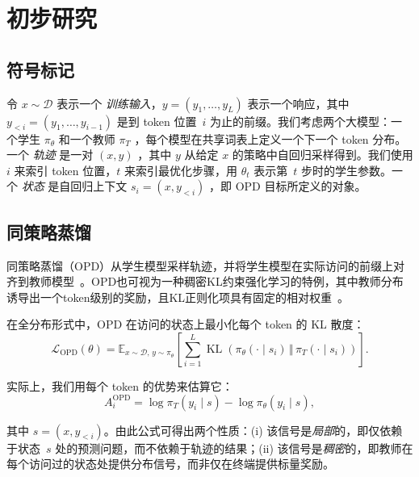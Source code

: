 \section{初步研究}
\label{sec:prelim}

\subsection{符号标记}
令 $x\sim\mathcal{D}$ 表示一个 \emph{训练输入}，$y=(y_1,\ldots,y_L)$ 表示一个响应，其中 $y_{<i}=(y_1,\ldots,y_{i-1})$ 是到 token 位置~$i$ 为止的前缀。我们考虑两个大模型：一个学生 $\pi_{\theta}$ 和一个教师 $\pi_T$ ，每个模型在共享词表上定义一个下一个 token 分布。一个 \emph{轨迹} 是一对 $(x,y)$ ，其中 $y$ 从给定 $x$ 的策略中自回归采样得到。我们使用 $i$ 来索引 token 位置，$t$ 来索引最优化步骤，用 $\theta_t$ 表示第~$t$ 步时的学生参数。一个 \emph{状态} 是自回归上下文 $s_i=(x,y_{<i})$ ，即 OPD 目标所定义的对象。 

\subsection{同策略蒸馏}
同策略蒸馏（OPD）从学生模型采样轨迹，并将学生模型在实际访问的前缀上对齐到教师模型~\citep{agarwal2024policy}。OPD也可视为一种稠密KL约束强化学习的特例，其中教师分布诱导出一个token级别的奖励，且KL正则化项具有固定的相对权重~\citep{yang2026learning}。

在全分布形式中，OPD 在访问的状态上最小化每个 token 的 KL 散度：
\begin{equation}
    \mathcal{L}_{\mathrm{OPD}}(\theta)
    =
    \mathbb{E}_{x\sim\mathcal{D},\,y\sim\pi_\theta}
    \left[
        \sum_{i=1}^{L}
        \operatorname{KL}\!\left(
            \pi_\theta(\cdot\mid s_i)
            \,\Vert\,
            \pi_T(\cdot\mid s_i)
        \right)
    \right].
\end{equation}

实际上，我们用每个 token 的优势来估算它：
\begin{equation}
    A_i^{\mathrm{OPD}} = \log \pi_T(y_i \mid s) - \log \pi_\theta(y_i \mid s),
    \label{eq:token-advantage}
\end{equation}

其中 $s = (x, y_{<i})$。由此公式可得出两个性质：(i) 该信号是\emph{局部}的，即仅依赖于状态~$s$ 处的预测问题，而不依赖于轨迹的结果；(ii) 该信号是\emph{稠密}的，即教师在每个访问过的状态处提供分布信号，而非仅在终端提供标量奖励。

